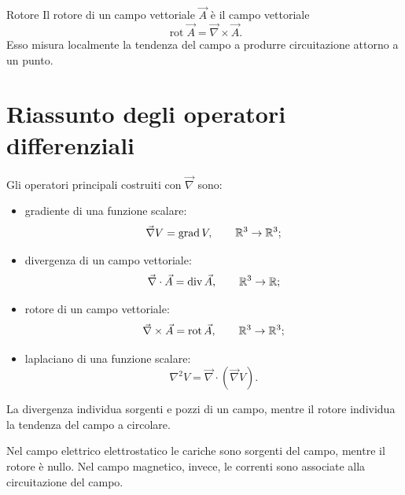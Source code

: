 \documentclass[a4paper]{article}
\begin{document}
\begin{snippetdefinition}{Rotore}
    Il rotore di un campo vettoriale \(\vec{A}\) è il campo vettoriale
    \[
        \operatorname{rot}\vec{A}=\vec{\nabla}\times\vec{A}.
    \]
    Esso misura localmente la tendenza del campo a produrre circuitazione attorno a un punto.
\end{snippetdefinition}

\section{Riassunto degli operatori differenziali}

Gli operatori principali costruiti con \(\vec{\nabla}\) sono:
\begin{itemize}
    \item gradiente di una funzione scalare:
        \[
            \vec{\nabla}V=\operatorname{grad}V,
            \qquad
            \mathbb{R}^3\to\mathbb{R}^3;
        \]
    \item divergenza di un campo vettoriale:
        \[
            \vec{\nabla}\cdot\vec{A}=\operatorname{div}\vec{A},
            \qquad
            \mathbb{R}^3\to\mathbb{R};
        \]
    \item rotore di un campo vettoriale:
        \[
            \vec{\nabla}\times\vec{A}=\operatorname{rot}\vec{A},
            \qquad
            \mathbb{R}^3\to\mathbb{R}^3;
        \]
    \item laplaciano di una funzione scalare:
        \[
            \nabla^2V=\vec{\nabla}\cdot(\vec{\nabla}V).
        \]
\end{itemize}

La divergenza individua sorgenti e pozzi di un campo, mentre il rotore individua la tendenza del campo a circolare.

\begin{center}
\end{center}

Nel campo elettrico elettrostatico le cariche sono sorgenti del campo, mentre il rotore è nullo. Nel campo magnetico, invece, le correnti sono associate alla circuitazione del campo.
\end{document}
